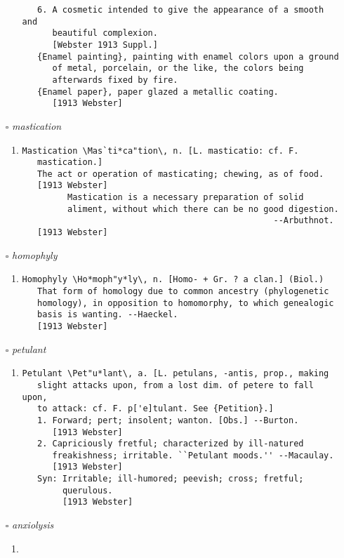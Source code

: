 \documentclass{article}
\begin{document}
\begin{itemize}
\begin{enumerate}
{\begin{lstlisting}
   6. A cosmetic intended to give the appearance of a smooth and
      beautiful complexion.
      [Webster 1913 Suppl.]
   {Enamel painting}, painting with enamel colors upon a ground
      of metal, porcelain, or the like, the colors being
      afterwards fixed by fire.
   {Enamel paper}, paper glazed a metallic coating.
      [1913 Webster]
\end{lstlisting}}
\end{enumerate}
\item[$\square$] \emph{ mastication }
\begin{enumerate}
\item{
\begin{lstlisting}
Mastication \Mas`ti*ca"tion\, n. [L. masticatio: cf. F.
   mastication.]
   The act or operation of masticating; chewing, as of food.
   [1913 Webster]
         Mastication is a necessary preparation of solid
         aliment, without which there can be no good digestion.
                                                  --Arbuthnot.
   [1913 Webster]
\end{lstlisting}}
\end{enumerate}
\item[$\square$] \emph{ homophyly }
\begin{enumerate}
\item{
\begin{lstlisting}
Homophyly \Ho*moph"y*ly\, n. [Homo- + Gr. ? a clan.] (Biol.)
   That form of homology due to common ancestry (phylogenetic
   homology), in opposition to homomorphy, to which genealogic
   basis is wanting. --Haeckel.
   [1913 Webster]
\end{lstlisting}}
\end{enumerate}
\item[$\square$] \emph{ petulant }
\begin{enumerate}
\item{
\begin{lstlisting}
Petulant \Pet"u*lant\, a. [L. petulans, -antis, prop., making
   slight attacks upon, from a lost dim. of petere to fall upon,
   to attack: cf. F. p['e]tulant. See {Petition}.]
   1. Forward; pert; insolent; wanton. [Obs.] --Burton.
      [1913 Webster]
   2. Capriciously fretful; characterized by ill-natured
      freakishness; irritable. ``Petulant moods.'' --Macaulay.
      [1913 Webster]
   Syn: Irritable; ill-humored; peevish; cross; fretful;
        querulous.
        [1913 Webster]
\end{lstlisting}}
\end{enumerate}
\item[$\square$] \emph{ anxiolysis }
\begin{enumerate}
\item{
\begin{lstlisting}


\end{lstlisting}}
\end{enumerate}
\end{itemize}
\end{document}
